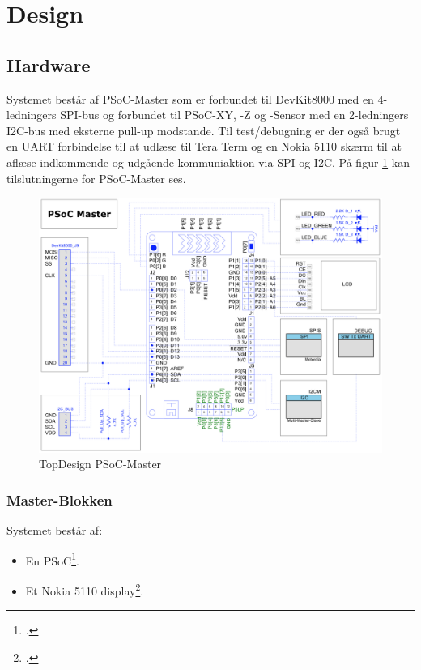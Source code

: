 \section{Design}

\subsection{Hardware}

Systemet består af PSoC-Master som er forbundet til DevKit8000 med en 4-ledningers SPI-bus og forbundet til PSoC-XY, -Z og -Sensor med en 2-ledningers I2C-bus med eksterne pull-up modstande. Til test/debugning er der også brugt en UART forbindelse til at udlæse til Tera Term og en Nokia 5110 skærm til at aflæse indkommende og udgående kommuniaktion via SPI og I2C. På figur \ref{fig:psoc-master_topdesign} kan tilslutningerne for PSoC-Master ses.

\begin{figure}[H] \centering
    \includegraphics[width=\textwidth]{Filer/PSoC-Master_TopDesign.png}
    \caption{TopDesign PSoC-Master}
    \label{fig:psoc-master_topdesign}
\end{figure}

\subsubsection{Master-Blokken}
Systemet består af:
\begin{itemize}
	\item En PSoC\footcite{psoc}.
	\item Et Nokia 5110 display\footcite{nokia}.
\end{itemize}

